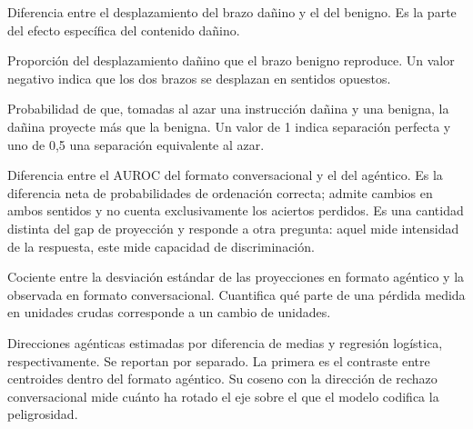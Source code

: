 \begin{description}[leftmargin=0pt, labelwidth=0pt, labelsep=0pt, style=nextline, itemsep=0.45em]
  \item[Interacción o diferencia en diferencias ($\Delta^{2} p$)] Diferencia entre el desplazamiento del brazo dañino y el del benigno. Es la parte del efecto específica del contenido dañino.

  \item[Fracción común ($\varphi$)] Proporción del desplazamiento dañino que el brazo benigno reproduce. Un valor negativo indica que los dos brazos se desplazan en sentidos opuestos.

  \item[AUROC] Probabilidad de que, tomadas al azar una instrucción dañina y una benigna, la dañina proyecte más que la benigna. Un valor de 1 indica separación perfecta y uno de 0{,}5 una separación equivalente al azar.

  \item[Gap de detección ($\Delta$AUROC)] Diferencia entre el AUROC del formato conversacional y el del agéntico. Es la diferencia neta de probabilidades de ordenación correcta; admite cambios en ambos sentidos y no cuenta exclusivamente los aciertos perdidos. Es una cantidad distinta del gap de proyección y responde a otra pregunta: aquel mide intensidad de la respuesta, este mide capacidad de discriminación.

  \item[Contracción de escala ($\kappa$)] Cociente entre la desviación estándar de las proyecciones en formato agéntico y la observada en formato conversacional. Cuantifica qué parte de una pérdida medida en unidades crudas corresponde a un cambio de unidades.

  \item[$\bm{w}_{\mathrm{DM}}$ y $\bm{w}_{\mathrm{LR}}$] Direcciones agénticas estimadas por diferencia de medias y regresión logística, respectivamente. Se reportan por separado. La primera es el contraste entre centroides dentro del formato agéntico. Su coseno con la dirección de rechazo conversacional mide cuánto ha rotado el eje sobre el que el modelo codifica la peligrosidad.

\end{description}

\clearpage

